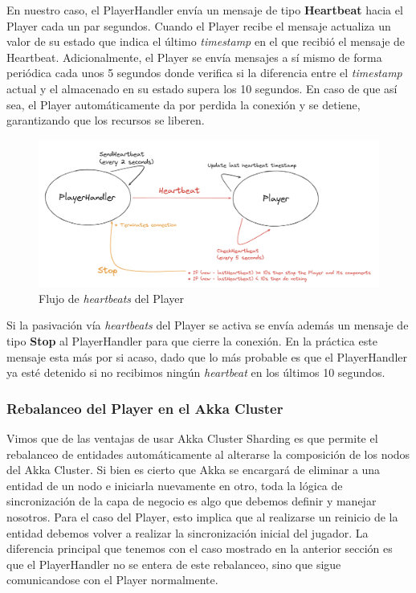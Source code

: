 En nuestro caso, el PlayerHandler envía un mensaje de tipo \textbf{Heartbeat} hacia el Player cada un par segundos. Cuando el Player recibe el mensaje actualiza un valor de su estado que indica el último \textit{timestamp}
en el que recibió el mensaje de Heartbeat. Adicionalmente, el Player se envía mensajes a sí mismo de forma periódica cada unos 5 segundos donde verifica si la diferencia entre el \textit{timestamp} actual y el almacenado en su estado
supera los 10 segundos. En caso de que así sea, el Player automáticamente da por perdida la conexión y se detiene, garantizando que los recursos se liberen.

\begin{figure}[htbp]
    \centering
    \includegraphics[width=1\textwidth]{../assets/player-heartbeat.png}
    \caption{Flujo de \textit{heartbeats} del Player}
\end{figure}

Si la pasivación vía \textit{heartbeats} del Player se activa se envía además un mensaje de tipo \textbf{Stop} al PlayerHandler para que cierre la conexión. En la práctica este mensaje esta más por si acaso, dado que lo más probable
es que el PlayerHandler ya esté detenido si no recibimos ningún \textit{heartbeat} en los últimos 10 segundos.

\subsubsection{Rebalanceo del Player en el Akka Cluster}

\noindent Vimos que de las ventajas de usar Akka Cluster Sharding es que permite el rebalanceo de entidades automáticamente al alterarse la composición de los nodos del Akka Cluster. Si bien es cierto que Akka se encargará de eliminar a una
entidad de un nodo e iniciarla nuevamente en otro, toda la lógica de sincronización de la capa de negocio es algo que debemos definir y manejar nosotros. Para el caso del Player, esto implica que al realizarse un reinicio de la entidad debemos 
volver a realizar la sincronización inicial del jugador. La diferencia principal que tenemos con el caso mostrado en la anterior sección es que el PlayerHandler no se entera de este rebalanceo, sino que sigue comunicandose con el Player normalmente.

